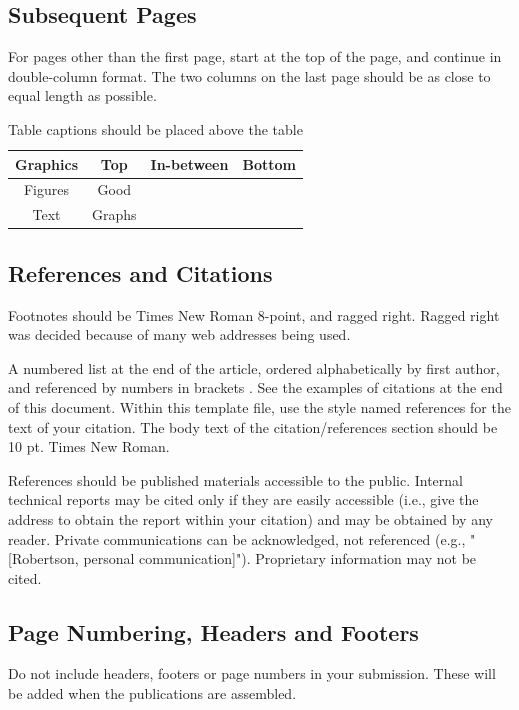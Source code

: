 	\subsection{Subsequent Pages}
	For pages other than the first page, start at the top of the page, and
	continue in double-column format. The two columns on the last page
	should be as close to equal length as possible.
	
	\begin{table}[htbp]\small
		\caption{Table captions should be placed above the table}
		\begin{tabularx}{\columnwidth}{ |c|c|>{\tblc}X|>{\tblc}X| }                    \hline
			Graphics & Top    & In-between & Bottom                                 \\ \hline
			Figures  & Good   & \multicolumn{2}{c|}{ Body text for the tables }     \\ \cline{1-2}
			Text     & Graphs & \multicolumn{2}{c|}{ should be Times Roman 10 pt. } \\ \hline
		\end{tabularx}
	\end{table}
	
	\subsection{References and Citations}
	Footnotes should be Times New Roman 8-point, and ragged right. Ragged
	right was decided because of many web addresses being used.
	\par
	A numbered list at the end of the article, ordered alphabetically by
	first author, and referenced by numbers in brackets \cite{Panther:2008}.
	See the examples of citations at the end of this document. Within this
	template file, use the style named references for the text of your
	citation. The body text of the citation/references section should be
	10 pt. Times New Roman.
	\par
	References should be published materials accessible to the public.
	Internal technical reports may be cited only if they are easily accessible 
	(i.e., give the address to obtain the report within your citation) and may
	be obtained by any reader. Private communications can be acknowledged, not
	referenced (e.g., "[Robertson, personal communication]"). Proprietary
	information may not be cited.
	
	\subsection{Page Numbering, Headers and Footers}
	Do not include headers, footers or page numbers in your submission.
	These will be added when the publications are assembled.
		
